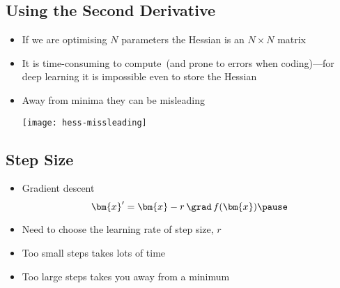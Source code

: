 
\begin{slide}
\section[-1]{Using the Second Derivative}

\begin{PauseHighLight}

\begin{itemize}\squeeze
\item If we are optimising $N$ parameters the Hessian is an $N\times N$
  matrix\pause
\item It is time-consuming to compute\pause\ (and prone to errors when
  coding)\pause---for deep learning it is impossible even to store the
  Hessian\pauseb
\item Away from minima they can be misleading
  \begin{center}
    \texttt{[image: hess-missleading]}\pause
  \end{center}
\end{itemize}

\end{PauseHighLight}
\end{slide}


\Outline %

\begin{slide}
\section{Step Size}

\begin{PauseHighLight}

\begin{itemize}\squeeze
\item Gradient descent
  \begin{displaymath}
    \bm{x}' = \bm{x} - r \, \grad \,f(\bm{x})\pause
  \end{displaymath}
\item Need to choose the learning rate of step size, $r$\pause
\item Too small steps takes lots of time\pause
\item Too large steps takes you away from a minimum\pause
\end{itemize}

\end{PauseHighLight}
\end{slide}

